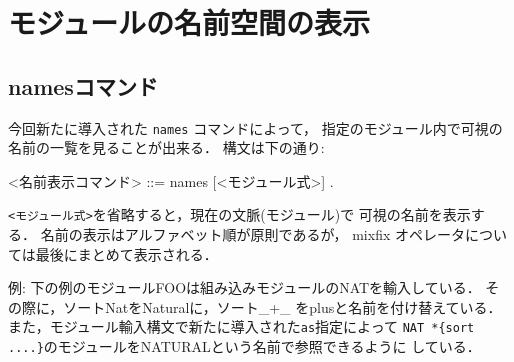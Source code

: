 \documentclass[a4paper,oneside,10pt]{memoir}
\newenvironment{vvtm}%
{\parskip=0pt\lineskip=0pt\begin{center}\begin{minipage}{0.8\textwidth}\begin{snugshade}}%
  {\end{snugshade}\end{minipage}\end{center}}
\begin{document}
\section{モジュールの名前空間の表示}
\subsection{namesコマンド}
\label{sec:names-command}
今回新たに導入された \texttt{names} コマンドによって，
指定のモジュール内で可視の名前の一覧を見ることが出来る．
構文は下の通り:
\begin{vvtm}
\begin{simplev}
<名前表示コマンド>  ::= names [<モジュール式>] .
\end{simplev}
\end{vvtm}

\texttt{<モジュール式>}を省略すると，現在の文脈(モジュール)で%
可視の名前を表示する．
名前の表示はアルファベット順が原則であるが，
mixfix オペレータについては最後にまとめて表示される．

例: 下の例のモジュールFOOは組み込みモジュールのNATを輸入している．
その際に，ソートNatをNaturalに，ソート\_+\_ をplusと名前を付け替えている．
また，モジュール輸入構文で新たに導入された\texttt{as}指定によって%
\texttt{NAT *\{sort ....\}}のモジュールをNATURALという名前で参照できるように%
している．
\end{document}
